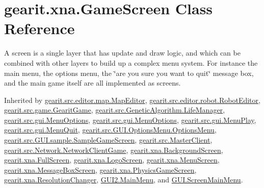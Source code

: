 \hypertarget{classgearit_1_1xna_1_1_game_screen}{\section{gearit.\+xna.\+Game\+Screen Class Reference}
\label{classgearit_1_1xna_1_1_game_screen}
}


A screen is a single layer that has update and draw logic, and which can be combined with other layers to build up a complex menu system. For instance the main menu, the options menu, the \char`\"{}are you sure you
want to quit\char`\"{} message box, and the main game itself are all implemented as screens.  




Inherited by \hyperlink{classgearit_1_1src_1_1editor_1_1map_1_1_map_editor}{gearit.\+src.\+editor.\+map.\+Map\+Editor}, \hyperlink{classgearit_1_1src_1_1editor_1_1robot_1_1_robot_editor}{gearit.\+src.\+editor.\+robot.\+Robot\+Editor}, \hyperlink{classgearit_1_1src_1_1game_1_1_gearit_game}{gearit.\+src.\+game.\+Gearit\+Game}, \hyperlink{classgearit_1_1src_1_1_genetic_algorithm_1_1_life_manager}{gearit.\+src.\+Genetic\+Algorithm.\+Life\+Manager}, \hyperlink{classgearit_1_1src_1_1gui_1_1_menu_options}{gearit.\+src.\+gui.\+Menu\+Options}, \hyperlink{classgearit_1_1src_1_1gui_1_1_menu_options}{gearit.\+src.\+gui.\+Menu\+Options}, \hyperlink{classgearit_1_1src_1_1gui_1_1_menu_play}{gearit.\+src.\+gui.\+Menu\+Play}, \hyperlink{classgearit_1_1src_1_1gui_1_1_menu_quit}{gearit.\+src.\+gui.\+Menu\+Quit}, \hyperlink{classgearit_1_1src_1_1_g_u_i_1_1_options_menu_1_1_options_menu}{gearit.\+src.\+G\+U\+I.\+Options\+Menu.\+Options\+Menu}, \hyperlink{classgearit_1_1src_1_1_g_u_i_1_1sample_1_1_sample_game_screen}{gearit.\+src.\+G\+U\+I.\+sample.\+Sample\+Game\+Screen}, \hyperlink{classgearit_1_1src_1_1_master_client}{gearit.\+src.\+Master\+Client}, \hyperlink{classgearit_1_1src_1_1_network_1_1_network_client_game}{gearit.\+src.\+Network.\+Network\+Client\+Game}, \hyperlink{classgearit_1_1xna_1_1_background_screen}{gearit.\+xna.\+Background\+Screen}, \hyperlink{classgearit_1_1xna_1_1_full_screen}{gearit.\+xna.\+Full\+Screen}, \hyperlink{classgearit_1_1xna_1_1_logo_screen}{gearit.\+xna.\+Logo\+Screen}, \hyperlink{classgearit_1_1xna_1_1_menu_screen}{gearit.\+xna.\+Menu\+Screen}, \hyperlink{classgearit_1_1xna_1_1_message_box_screen}{gearit.\+xna.\+Message\+Box\+Screen}, \hyperlink{classgearit_1_1xna_1_1_physics_game_screen}{gearit.\+xna.\+Physics\+Game\+Screen}, \hyperlink{classgearit_1_1xna_1_1_resolution_changer}{gearit.\+xna.\+Resolution\+Changer}, \hyperlink{class_g_u_i2_1_1_main_menu}{G\+U\+I2.\+Main\+Menu}, and \hyperlink{class_g_u_i_1_1_screen_main_menu}{G\+U\+I.\+Screen\+Main\+Menu}.

